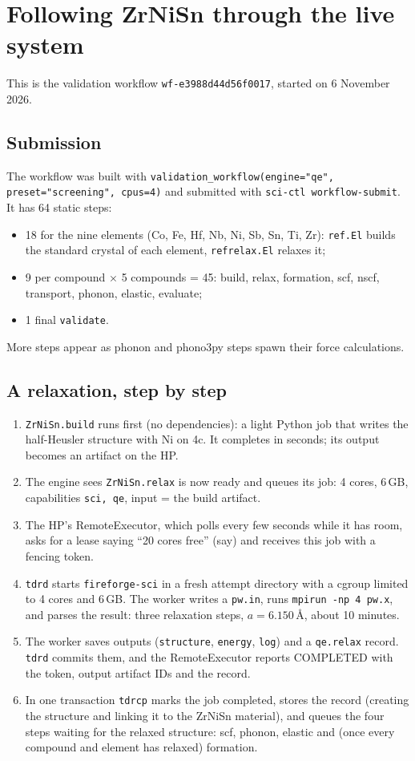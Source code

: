 \documentclass[11pt,a4paper]{report}
\newcommand{\code}[1]{\texttt{#1}}
\begin{document}
\chapter{Following ZrNiSn through the live system}

This is the validation workflow \code{wf-e3988d44d56f0017}, started on 6 November 2026.

\section{Submission}

The workflow was built with \code{validation\_workflow(engine="qe", preset="screening", cpus=4)}
and submitted with \code{sci-ctl workflow-submit}. It has 64 static steps:
\begin{itemize}
\item 18 for the nine elements (Co, Fe, Hf, Nb, Ni, Sb, Sn, Ti, Zr): \code{ref.El} builds the
  standard crystal of each element, \code{refrelax.El} relaxes it;
\item 9 per compound $\times$ 5 compounds = 45: build, relax, formation, scf, nscf, transport,
  phonon, elastic, evaluate;
\item 1 final \code{validate}.
\end{itemize}
More steps appear as phonon and phono3py steps spawn their force calculations.

\section{A relaxation, step by step}

\begin{enumerate}
\item \code{ZrNiSn.build} runs first (no dependencies): a light Python job that writes the
  half-Heusler structure with Ni on 4c. It completes in seconds; its output becomes an artifact
  on the HP.
\item The engine sees \code{ZrNiSn.relax} is now ready and queues its job: 4 cores, 6\,GB,
  capabilities \code{sci, qe}, input = the build artifact.
\item The HP's RemoteExecutor, which polls every few seconds while it has room, asks for a lease
  saying ``20 cores free'' (say) and receives this job with a fencing token.
\item \code{tdrd} starts \code{fireforge-sci} in a fresh attempt directory with a cgroup limited
  to 4 cores and 6\,GB. The worker writes a \code{pw.in}, runs \code{mpirun -np 4 pw.x}, and parses
  the result: three relaxation steps, $a=6.150$\,\AA, about 10 minutes.
\item The worker saves outputs (\code{structure}, \code{energy}, \code{log}) and a \code{qe.relax}
  record. \code{tdrd} commits them, and the RemoteExecutor reports COMPLETED with the token,
  output artifact IDs and the record.
\item In one transaction \code{tdrcp} marks the job completed, stores the record (creating the
  structure and linking it to the ZrNiSn material), and queues the four steps waiting for the
  relaxed structure: scf, phonon, elastic and (once every compound and element has relaxed)
  formation.
\end{enumerate}
\end{document}
